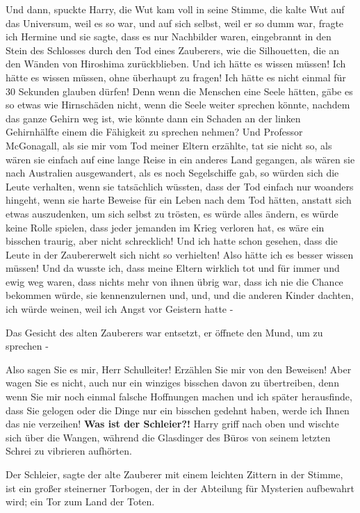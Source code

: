 \glqq{}Und dann\grqq{}, spuckte Harry, die Wut kam voll in seine Stimme, die
kalte Wut auf das Universum, weil es so war, und auf sich selbst, weil er so
dumm war, \glqq{}fragte ich Hermine und sie sagte, dass es nur Nachbilder waren,
eingebrannt in den Stein des Schlosses durch den Tod eines Zauberers, wie die
Silhouetten, die an den Wänden von Hiroshima zurückblieben. Und ich hätte es
wissen müssen! Ich hätte es wissen müssen, ohne überhaupt zu fragen! Ich hätte
es nicht einmal für 30 Sekunden glauben dürfen! Denn wenn die Menschen eine
Seele hätten, gäbe es so etwas wie Hirnschäden nicht, wenn die Seele weiter
sprechen könnte, nachdem das ganze Gehirn weg ist, wie könnte dann ein Schaden
an der linken Gehirnhälfte einem die Fähigkeit zu sprechen nehmen? Und Professor
McGonagall, als sie mir vom Tod meiner Eltern erzählte, tat sie nicht so, als
wären sie einfach auf eine lange Reise in ein anderes Land gegangen, als wären
sie nach Australien ausgewandert, als es noch Segelschiffe gab, so würden sich
die Leute verhalten, wenn sie tatsächlich wüssten, dass der Tod einfach nur
woanders hingeht, wenn sie harte Beweise für ein Leben nach dem Tod hätten,
anstatt sich etwas auszudenken, um sich selbst zu trösten, es würde alles
ändern, es würde keine Rolle spielen, dass jeder jemanden im Krieg verloren hat,
es wäre ein bisschen traurig, aber nicht schrecklich! Und ich hatte schon
gesehen, dass die Leute in der Zaubererwelt sich nicht so verhielten! Also hätte
ich es besser wissen müssen! Und da wusste ich, dass meine Eltern wirklich tot
und für immer und ewig weg waren, dass nichts mehr von ihnen übrig war, dass ich
nie die Chance bekommen würde, sie kennenzulernen und, und, und die anderen
Kinder dachten, ich würde weinen, weil ich Angst vor Geistern hatte -\grqq{}

Das Gesicht des alten Zauberers war entsetzt, er öffnete den Mund, um zu
sprechen -

\glqq{}Also sagen Sie es mir, Herr Schulleiter! Erzählen Sie mir von den Beweisen!
Aber wagen Sie es nicht, auch nur ein winziges bisschen davon zu übertreiben,
denn wenn Sie mir noch einmal falsche Hoffnungen machen und ich später
herausfinde, dass Sie gelogen oder die Dinge nur ein bisschen gedehnt haben,
werde ich Ihnen das nie verzeihen! \textbf{Was ist der Schleier?!}\grqq{} Harry
griff nach oben und wischte sich über die Wangen, während die Glasdinger des
Büros von seinem letzten Schrei zu vibrieren aufhörten.

\glqq{}Der Schleier\grqq{}, sagte der alte Zauberer mit einem leichten Zittern in
der Stimme, \glqq{}ist ein großer steinerner Torbogen, der in der Abteilung für
Mysterien aufbewahrt wird; ein Tor zum Land der Toten.\grqq{}

